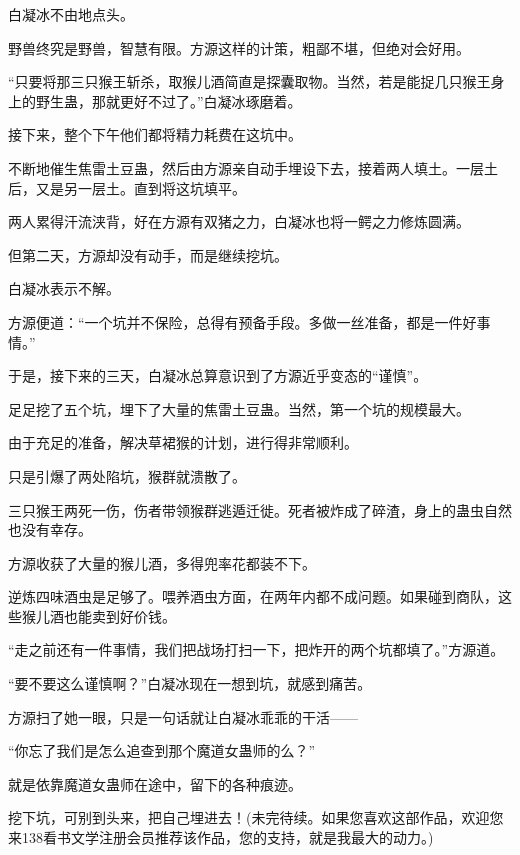 \begin{this_body}
白凝冰不由地点头。

野兽终究是野兽，智慧有限。方源这样的计策，粗鄙不堪，但绝对会好用。

“只要将那三只猴王斩杀，取猴儿酒简直是探囊取物。当然，若是能捉几只猴王身上的野生蛊，那就更好不过了。”白凝冰琢磨着。

接下来，整个下午他们都将精力耗费在这坑中。

不断地催生焦雷土豆蛊，然后由方源亲自动手埋设下去，接着两人填土。一层土后，又是另一层土。直到将这坑填平。

两人累得汗流浃背，好在方源有双猪之力，白凝冰也将一鳄之力修炼圆满。

但第二天，方源却没有动手，而是继续挖坑。

白凝冰表示不解。

方源便道：“一个坑并不保险，总得有预备手段。多做一丝准备，都是一件好事情。”

于是，接下来的三天，白凝冰总算意识到了方源近乎变态的“谨慎”。

足足挖了五个坑，埋下了大量的焦雷土豆蛊。当然，第一个坑的规模最大。

由于充足的准备，解决草裙猴的计划，进行得非常顺利。

只是引爆了两处陷坑，猴群就溃散了。

三只猴王两死一伤，伤者带领猴群逃遁迁徙。死者被炸成了碎渣，身上的蛊虫自然也没有幸存。

方源收获了大量的猴儿酒，多得兜率花都装不下。

逆炼四味酒虫是足够了。喂养酒虫方面，在两年内都不成问题。如果碰到商队，这些猴儿酒也能卖到好价钱。

“走之前还有一件事情，我们把战场打扫一下，把炸开的两个坑都填了。”方源道。

“要不要这么谨慎啊？”白凝冰现在一想到坑，就感到痛苦。

方源扫了她一眼，只是一句话就让白凝冰乖乖的干活——

“你忘了我们是怎么追查到那个魔道女蛊师的么？”

就是依靠魔道女蛊师在途中，留下的各种痕迹。

挖下坑，可别到头来，把自己埋进去！(未完待续。如果您喜欢这部作品，欢迎您来138看书文学注册会员推荐该作品，您的支持，就是我最大的动力。)

\end{this_body}

